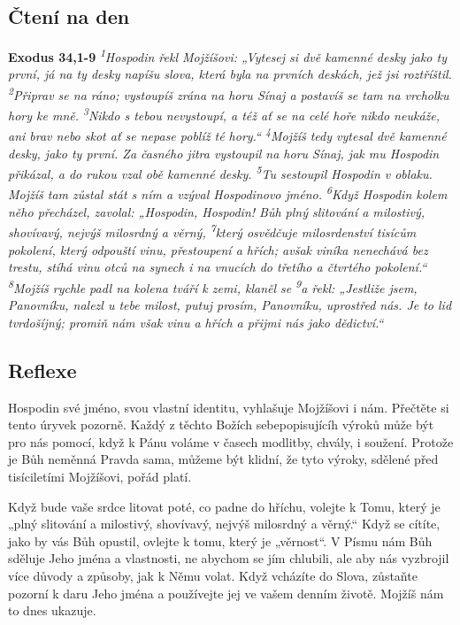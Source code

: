 \documentclass[11pt]{article}
\begin{document}
\subsection*{Čtení na den}
\textbf{Exodus 34,1-9}
\newline
\textit{
\textsuperscript{1}Hospodin řekl Mojžíšovi: „Vytesej si dvě kamenné desky jako ty první, já na ty desky napíšu slova, která byla na prvních deskách, jež jsi roztříštil.
\textsuperscript{2}Připrav se na ráno; vystoupíš zrána na horu Sínaj a postavíš se tam na vrcholku hory ke mně.
\textsuperscript{3}Nikdo s tebou nevystoupí, a též ať se na celé hoře nikdo neukáže, ani brav nebo skot ať se nepase poblíž té hory.“
\textsuperscript{4}Mojžíš tedy vytesal dvě kamenné desky, jako ty první. Za časného jitra vystoupil na horu Sínaj, jak mu Hospodin přikázal, a do rukou vzal obě kamenné desky.
\textsuperscript{5}Tu sestoupil Hospodin v oblaku. Mojžíš tam zůstal stát s ním a vzýval Hospodinovo jméno.
\textsuperscript{6}Když Hospodin kolem něho přecházel, zavolal: „Hospodin, Hospodin! Bůh plný slitování a milostivý, shovívavý, nejvýš milosrdný a věrný,
\textsuperscript{7}který osvědčuje milosrdenství tisícům pokolení, který odpouští vinu, přestoupení a hřích; avšak viníka nenechává bez trestu, stíhá vinu otců na synech i na vnucích do třetího a čtvrtého pokolení.“
\textsuperscript{8}Mojžíš rychle padl na kolena tváří k zemi, klaněl se
\textsuperscript{9}a řekl: „Jestliže jsem, Panovníku, nalezl u tebe milost, putuj prosím, Panovníku, uprostřed nás. Je to lid tvrdošíjný; promiň nám však vinu a hřích a přijmi nás jako dědictví.“
}

\subsection*{Reflexe}
Hospodin své jméno, svou vlastní identitu, vyhlašuje Mojžíšovi i nám. Přečtěte si tento úryvek pozorně. Každý z těchto
Božích sebepopisujícíh výroků může být pro nás pomocí, když k Pánu voláme v časech modlitby, chvály, i soužení.
Protože je Bůh neměnná Pravda sama, můžeme být klidní, že tyto výroky, sdělené před tisíciletími Mojžíšovi, pořád
platí.

Když bude vaše srdce litovat poté, co padne do hříchu, volejte k Tomu, který je „plný slitování a milostivý, shovívavý,
nejvýš milosrdný a věrný.“ Když se cítíte, jako by vás Bůh opustil, ovlejte k tomu, který je „věrnost“. V Písmu nám
Bůh sděluje Jeho jména a vlastnosti, ne abychom se jím chlubili, ale aby nás vyzbrojil více důvody a způsoby, jak
k Němu volat. Když vcházíte do Slova, zůstaňte pozorní k daru Jeho jména a používejte jej ve vašem denním životě.
Mojžíš nám to dnes ukazuje.
\end{document}
